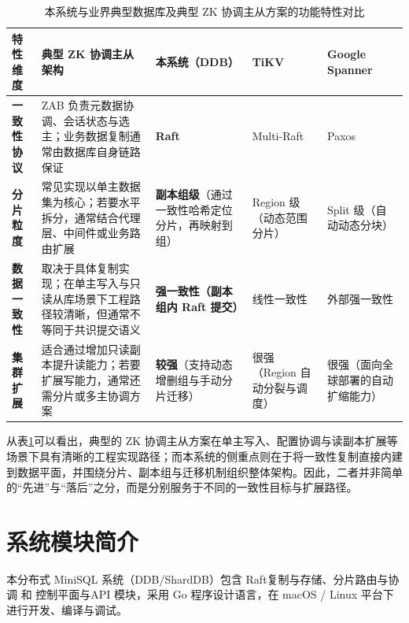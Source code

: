 \documentclass[UTF8,a4paper,12pt]{ctexart}
\newcommand{\languageName}{Go}
\newcommand{\platformName}{macOS / Linux}
\newcommand{\moduleA}{Raft复制与存储}
\newcommand{\moduleB}{分片路由与协调}
\newcommand{\moduleC}{控制平面与API}
\begin{document}
\begin{table}[!htbp]
  \centering
  \caption{本系统与业界典型数据库及典型 ZK 协调主从方案的功能特性对比}
  \label{tab:feature-comparison}
  \begin{tcolorbox}[
    enhanced,
    colback=white,
    colframe=GoogleBorder,
    arc=6pt,
    boxrule=1pt,
    left=0pt, right=0pt, top=0pt, bottom=0pt,
    boxsep=0pt,
    fontupper=\sffamily
  ]
  \renewcommand{\arraystretch}{1.8}
  \begin{tabularx}{\textwidth}{p{2.2cm} | p{3cm} | X | X | X}
    \rowcolor{GoogleHeader}
    \textbf{特性维度} & \textbf{典型 ZK 协调主从架构} & \textbf{本系统（DDB）} & \textbf{TiKV} & \textbf{Google Spanner} \\
    \hline
    \textbf{一致性协议} & ZAB 负责元数据协调、会话状态与选主；业务数据复制通常由数据库自身链路保证 & \textbf{Raft} & Multi-Raft & Paxos \\
    \hline
    \textbf{分片粒度} & 常见实现以单主数据集为核心；若要水平拆分，通常结合代理层、中间件或业务路由扩展 & \textbf{副本组级}（通过一致性哈希定位分片，再映射到组） & Region 级（动态范围分片） & Split 级（自动动态分块） \\
    \hline
    \textbf{数据一致性} & 取决于具体复制实现；在单主写入与只读从库场景下工程路径较清晰，但通常不等同于共识提交语义 & \textbf{强一致性（副本组内 Raft 提交）} & 线性一致性 & 外部强一致性 \\
    \hline
    \textbf{集群扩展} & 适合通过增加只读副本提升读能力；若要扩展写能力，通常还需分片或多主协调方案 & \textbf{较强}（支持动态增删组与手动分片迁移） & 很强（Region 自动分裂与调度） & 很强（面向全球部署的自动扩缩能力） \\
  \end{tabularx}
  \end{tcolorbox}
\end{table}

从表\ref{tab:feature-comparison}可以看出，典型的 ZK 协调主从方案在单主写入、配置协调与读副本扩展等场景下具有清晰的工程实现路径；而本系统的侧重点则在于将一致性复制直接内建到数据平面，并围绕分片、副本组与迁移机制组织整体架构。因此，二者并非简单的“先进”与“落后”之分，而是分别服务于不同的一致性目标与扩展路径。

\section{系统模块简介}
本分布式 MiniSQL 系统（DDB/ShardDB）包含 \moduleA{}、\moduleB{} 和 \moduleC{} 模块，采用 \languageName{} 程序设计语言，在 \platformName{} 平台下进行开发、编译与调试。
\end{document}

